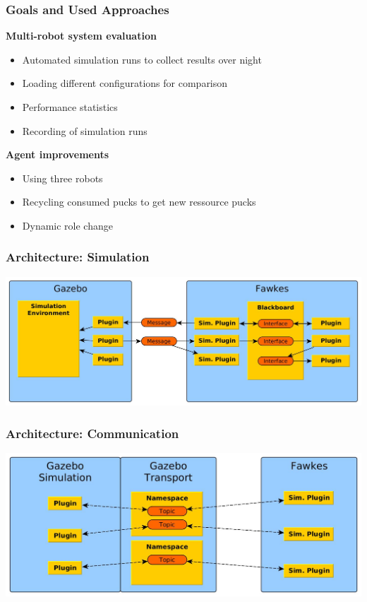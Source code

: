 \documentclass[]{beamer}
\begin{document}
\begin{frame}
  \frametitle{Goals and Used Approaches}
  \large{\textbf{Multi-robot system evaluation}}
  \begin{itemize} 
  \item Automated simulation runs to collect results over night
  \item Loading different configurations for comparison
  \item Performance statistics
  \item Recording of simulation runs
  \end{itemize} 
  \pause
  \large{\textbf{Agent improvements}}
  \begin{itemize} 
  \item Using three robots 
  \item Recycling consumed pucks to get new ressource pucks
  \item Dynamic role change 
  \end{itemize}
\end{frame}

\begin{frame}
  \frametitle{Architecture: Simulation}
  \includegraphics[width=\textwidth]{../tabs/fawkes_gazebo.jpg}
\end{frame}

\begin{frame}
  \frametitle{Architecture: Communication}
  \includegraphics[width=\textwidth]{../tabs/communication.jpg}
\end{frame}
\end{document}
